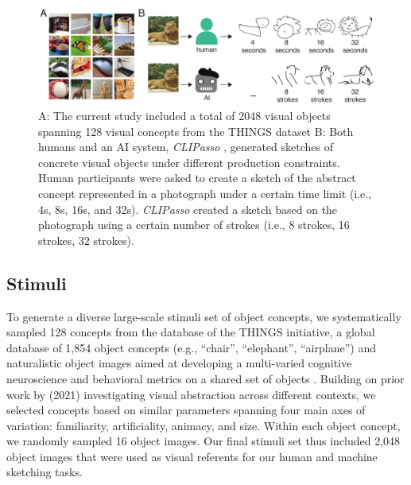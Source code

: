 \documentclass[10pt,letterpaper]{article}
\begin{document}

\begin{figure}
    \centering
    \includegraphics[width= 1\linewidth]{figures/VAB_task.pdf}
    \caption{A: The current study included a total of 2048 visual objects spanning 128 visual concepts from the THINGS dataset \cite{hebart2019things} B:
    Both humans and an AI system, \textit{CLIPasso} \cite{vinker2022clipasso}, generated sketches of concrete visual objects under different production constraints. Human participants were asked to create a sketch of the abstract concept represented in a photograph under a certain time limit (i.e., 4s, 8s, 16s, and 32s). \textit{CLIPasso} created a sketch based on the photograph using a certain number of strokes (i.e., 8 strokes, 16 strokes, 32 strokes).}
    \label{fig:trial}
\end{figure}

\subsection{Stimuli}
To generate a diverse large-scale stimuli set of object concepts, we systematically sampled 128 concepts from the database of the THINGS initiative, a global database of 1,854 object concepts (e.g., ``chair'', ``elephant'', ``airplane'') and naturalistic object images aimed at developing a multi-varied cognitive neuroscience and behavioral metrics on a shared set of objects \cite{hebart2019things}. 
Building on prior work by \citeauthor{yang2021visual} (2021) investigating visual abstraction across different contexts, we selected concepts based on similar parameters spanning four main axes of variation: familiarity, artificiality, animacy, and size. 
Within each object concept, we randomly sampled 16 object images. 
Our final stimuli set thus included 2,048 object images that were used as visual referents for our human and machine sketching tasks.
\end{document}
